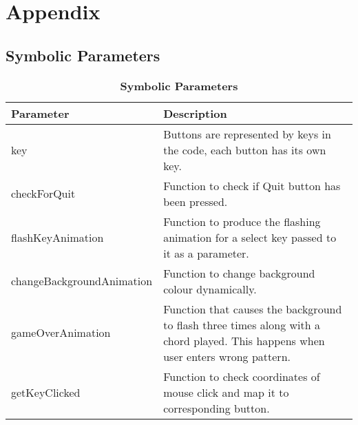\documentclass[12pt, titlepage]{article}
\begin{document}
\newpage
\section{Appendix}
\subsection{Symbolic Parameters}
\begin{table}[h]
\caption{\bf Symbolic Parameters}
\begin{tabularx}{\textwidth}{p{6cm}X}
\toprule {\bf Parameter} & {\bf Description}\\
\midrule
key & Buttons are represented by keys in the code, each button has its own key.\\
checkForQuit & Function to check if Quit button has been pressed.\\
flashKeyAnimation & Function to produce the flashing animation for a select key passed to it as a parameter.\\
changeBackgroundAnimation & Function to change background colour dynamically.\\
gameOverAnimation & Function that causes the background to flash three times along with a chord played. This happens when user enters wrong pattern.\\
getKeyClicked & Function to check coordinates of mouse click and map it to corresponding button.\\
\bottomrule
\end{tabularx}
\end{table}
\end{document}
